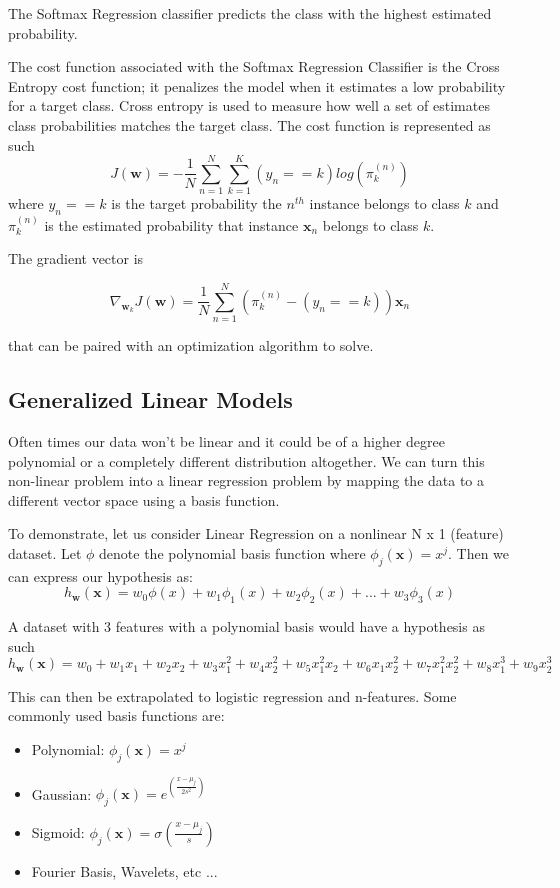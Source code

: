 \documentclass[12pt]{article}
\begin{document}
            The Softmax Regression classifier predicts the class with the highest estimated probability.

            The cost function associated with the Softmax Regression Classifier is the Cross Entropy cost function; it penalizes the model when it estimates a low probability for a target class. Cross entropy is used to
            measure how well a set of estimates class probabilities matches the target class. The cost function is represented as such
            $$ J(\boldsymbol{w}) = -\frac{1}{N}\sum_{n=1}^N \sum_{k=1}^K (y_n == k) log(\pi_{k}^{(n)}) $$
            where $y_n == k$ is the target probability the $n^{th}$ instance belongs to class $k$ and $\pi_{k}^{(n)}$ is the estimated probability that instance $\boldsymbol{x}_n$ belongs to class $k$.

            The gradient vector is

            $$ \nabla_{\boldsymbol{w}_k} J(\boldsymbol{w}) = \frac{1}{N}\sum_{n=1}^N(\pi^{(n)}_k - (y_n == k))\boldsymbol{x}_n $$

            that can be paired with an optimization algorithm to solve.

    \subsection{Generalized Linear Models}
        Often times our data won't be linear and it could be of a higher degree polynomial or a completely different distribution altogether. We can turn this non-linear problem into 
        a linear regression problem by mapping the data to a different vector space using a basis function.

        To demonstrate, let us consider Linear Regression on a nonlinear N x 1 (feature) dataset. Let $\phi$ denote the polynomial basis function where
        $\phi_j(\boldsymbol{x}) = x^j$. Then we can express our hypothesis as: 
        $$ h_{\boldsymbol{w}}(\boldsymbol{x}) = w_0\phi(x) + w_1\phi_1(x) + w_2\phi_2(x) + ... + w_3\phi_3(x) $$

        A dataset with 3 features with a polynomial basis would have a hypothesis as such
        $$ h_{\boldsymbol{w}}(\boldsymbol{x}) = w_0 + w_1x_1 + w_2x_2 + w_3x_1^2 + w_4x_2^2 + w_5x_1^2x_2 + w_6x_1x_2^2 + w_7x_1^2x_2^2 + w_8x_1^3 + w_9x_2^3 $$

        This can then be extrapolated to logistic regression and n-features. Some commonly used basis functions are:

        \begin{itemize}
            \item Polynomial: $\phi_j(\boldsymbol{x}) = x^j$
            \item Gaussian: $\phi_j(\boldsymbol{x}) = e^{(\frac{x-\mu_j}{2s^2})}$
            \item Sigmoid: $\phi_j(\boldsymbol{x}) = \sigma{(\frac{x-\mu_j}{s})}$
            \item Fourier Basis, Wavelets, etc ...
        \end{itemize}
\end{document}
